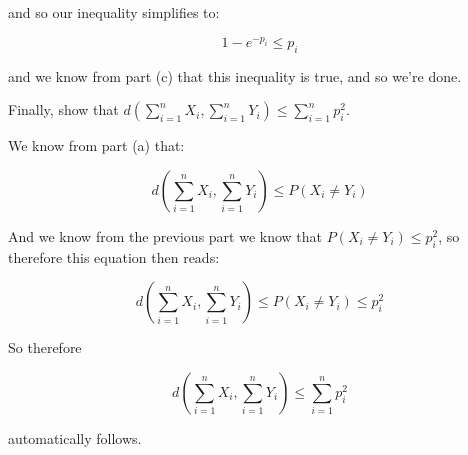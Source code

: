 \documentclass[11pt]{article}
\begin{document}
\begin{Parts}
\begin{solution}
        and so our inequality simplifies to: 

        \[ 1-e^{-p_i} \le p_i\] 

        and we know from part (c) that this inequality is true, and so we're done.
    \end{solution}
    \Part Finally, show that $d(\sum_{i=1}^n X_i, \sum_{i=1}^n Y_i) \leq \sum_{i=1}^n p_i^2$.

    \begin{solution}
        We know from part (a) that: 

        \[ d\left(\sum_{i=1}^n X_i, \sum_{i=1}^n Y_i\right) \le P(X_i \neq Y_i)\] 

        And we know from the previous part we know that $P(X_i \neq Y_i) \le p_i^2$, so therefore this equation then reads: 

        \[ d\left(\sum_{i=1}^n X_i, \sum_{i=1}^n Y_i\right) \le P(X_i \neq Y_i) \le p_i^2\] 

        So therefore

        \[ d\left(\sum_{i=1}^n X_i, \sum_{i=1}^n Y_i\right) \leq \sum_{i=1}^n p_i^2\]

        automatically follows. 
    \end{solution}
\end{Parts}
\end{document}
